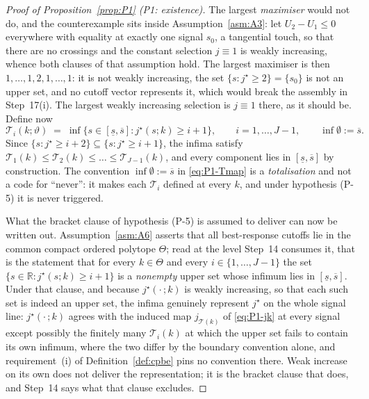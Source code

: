 \documentclass[11pt]{article}
\newcommand{\Tmap}{\mathcal{T}}
\begin{document}
\begin{proof}[Proof of Proposition~\ref{prop:P1} (P1: existence)]
The largest \emph{maximiser} would not do, and the counterexample sits inside
Assumption~\ref{asm:A3}: let $U_2-U_1 \le 0$ everywhere with equality at exactly one signal $s_0$, a
tangential touch, so that there are no crossings and the constant selection $j \equiv 1$ is weakly
increasing, whence both clauses of that assumption hold. The largest maximiser is then $1,\dots,1,
2,1,\dots,1$: it is not weakly increasing, the set $\{s : j^\star \ge 2\} = \{s_0\}$ is not an upper
set, and no cutoff vector represents it, which would break the assembly in Step~17(i). The largest
weakly increasing selection is $j \equiv 1$ there, as it should be. Define now
\begin{equation}
\label{eq:P1-Tmap}
\Tmap_i(k;\vartheta) \;=\; \inf\bigl\{s \in [\underline s,\overline s] :
j^\star(s;k) \ge i+1\bigr\},
\qquad i = 1,\dots,J-1,
\qquad \inf\emptyset := \overline s .
\end{equation}
Since $\{s : j^\star \ge i+2\} \subseteq \{s : j^\star \ge i+1\}$, the infima satisfy
$\Tmap_1(k) \le \Tmap_2(k) \le \dots \le \Tmap_{J-1}(k)$, and every component lies in
$[\underline s,\overline s]$ by construction. The convention $\inf\emptyset := \overline s$ in
\eqref{eq:P1-Tmap} is a \emph{totalisation} and not a code for ``never'': it makes each $\Tmap_i$
defined at every $k$, and under hypothesis (P-5) it is never triggered.

What the bracket clause of hypothesis (P-5) is assumed to deliver can now be written out.
Assumption~\ref{asm:A6} asserts that all best-response cutoffs lie in the common compact ordered
polytope $\Theta$; read at the level Step~14 consumes it, that is the statement that for every
$k \in \Theta$ and every $i \in \{1,\dots,J-1\}$ the set $\{s \in \mathbb R : j^\star(s;k) \ge i+1\}$
is a \emph{nonempty} upper set whose infimum lies in $[\underline s,\overline s]$. Under that clause,
and because $j^\star(\cdot\,;k)$ is weakly increasing, so that each such set is indeed an upper set,
the infima genuinely represent $j^\star$ on the whole signal line: $j^\star(\cdot\,;k)$ agrees with
the induced map $j_{\Tmap(k)}$ of \eqref{eq:P1-jk} at every signal except possibly the finitely many
$\Tmap_i(k)$ at which the upper set fails to contain its own infimum, where the two differ by the
boundary convention alone, and requirement~(i) of Definition~\ref{def:cpbe} pins no convention there.
Weak increase on its own does not deliver the representation; it is the bracket clause that does, and
Step~14 says what that clause excludes.


\end{proof}
\end{document}
